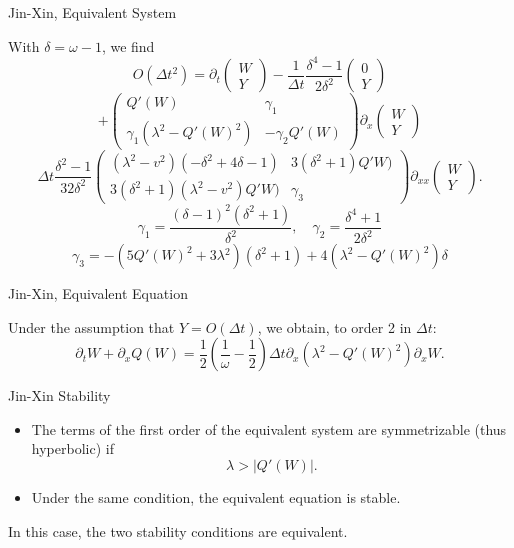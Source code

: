 \documentclass[english]{beamer}
\begin{document}
\begin{frame}{Jin-Xin, Equivalent System}

With $\delta=\omega-1$, we find
\[
O(\Delta t^{2})=\partial_{t}\left(\begin{array}{c}
W\\
Y
\end{array}\right)-\frac{1}{\Delta t}\frac{\delta^{4}-1}{2\delta^{2}}\left(\begin{array}{c}
0\\
Y
\end{array}\right)
\]
\[
+\left(\begin{array}{cc}
Q'(W) & \gamma_{1}\\
\gamma_{1}(\lambda^{2}-Q'(W)^{2}) & -\gamma_{2}Q'(W)
\end{array}\right)\partial_{x}\left(\begin{array}{c}
W\\
Y
\end{array}\right)
\]
\[
\Delta t\frac{\delta^{2}-1}{32\delta^{2}}\left(\begin{array}{cc}
(\lambda^{2}-v^{2})(-\delta^{2}+4\delta-1) & 3(\delta^{2}+1)Q'W)\\
3(\delta^{2}+1)(\lambda^{2}-v^{2})Q'W) & \gamma_{3}
\end{array}\right)\partial_{xx}\left(\begin{array}{c}
W\\
Y
\end{array}\right).
\]
\[
\gamma_{1}=\frac{\left(\delta-1\right)^{2}\left(\delta^{2}+1\right)}{\delta^{2}},\quad\gamma_{2}=\frac{\delta^{4}+1}{2\delta^{2}}
\]
\[
\gamma_{3}=-(5Q'(W)^{2}+3\lambda{{}^2})(\delta^{2}+1)+4(\lambda^{2}-Q'(W)^{2})\delta
\]

\end{frame}
%
\begin{frame}{Jin-Xin, Equivalent Equation}

Under the assumption that $Y=O(\Delta t)$, we obtain, to order 2 in
$\Delta t$:
\[
\partial_{t}W+\partial_{x}Q(W)=\frac{1}{2}(\frac{1}{\omega}-\frac{1}{2})\Delta t\partial_{x}(\lambda^{2}-Q'(W)^{2})\partial_{x}W.
\]

\end{frame}
%
\begin{frame}{Jin-Xin Stability}
\begin{itemize}
\item The terms of the first order of the equivalent system are symmetrizable (thus hyperbolic) if 
\[
\lambda>\left|Q'(W)\right|.
\]
\item Under the same condition, the equivalent equation is stable.
\end{itemize}
In this case, the two stability conditions are equivalent.
\end{frame}
%
\end{document}
